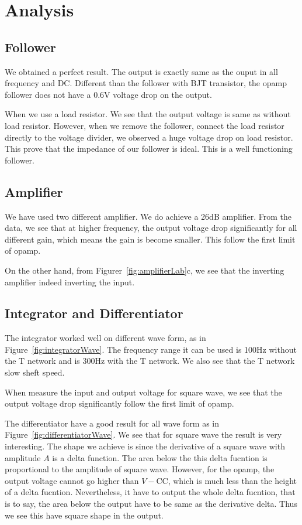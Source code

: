 \documentclass[aps,prl,reprint]{revtex4-1}
\begin{document}
\section{Analysis}
    \subsection{Follower}
        We obtained a perfect result. The output is exactly same as the ouput in all frequency and DC. Different than the follower with BJT transistor, the opamp follower does not have a 0.6V voltage drop on the output.

        When we use a load resistor. We see that the output voltage is same as without load resistor. However, when we remove the follower, connect the load resistor directly to the voltage divider, we observed a huge voltage drop on load resistor. This prove that the impedance of our follower is ideal. This is a well functioning follower.
    \subsection{Amplifier}
        We have used two different amplifier. We do achieve a 26dB amplifier. From the data, we see that at higher frequency, the output voltage drop significantly for all different gain, which means the gain is become smaller. This follow the first limit of opamp.

        On the other hand, from Figurer~\ref{fig:amplifierLab}c, we see that the inverting amplifier indeed inverting the input.
    \subsection{Integrator and Differentiator}
        The integrator worked well on different wave form, as in Figure~\ref{fig:integratorWave}. The frequency range it can be used is 100Hz without the T network and is 300Hz with the T network. We also see that the T network slow sheft speed.

        When measure the input and output voltage for square wave, we see that the output voltage drop significantly follow the first limit of opamp.

        The differentiator have a good result for all wave form as in Figure~\ref{fig:differentiatorWave}. We see that for square wave the result is very interesting. The shape we achieve is since the derivative of a square wave with amplitude $A$ is a delta function. The area below the this delta fucntion is proportional to the amplitude of square wave. However, for the opamp, the output voltage cannot go higher than $V-\text{CC}$, which is much less than the height of a delta fucntion. Nevertheless, it have to output the whole delta fucntion, that is to say, the area below the output have to be same as the derivative delta. Thus we see this have square shape in the output.
\end{document}

